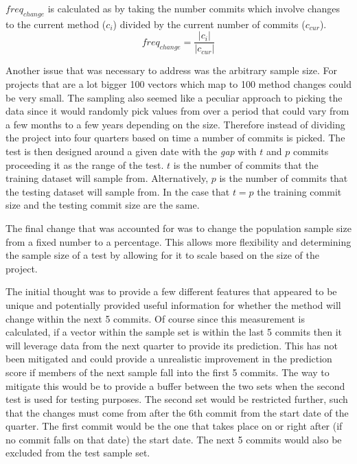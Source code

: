 $freq_{change}$ is calculated as by taking the number commits which involve changes to the current method ($c_i$) divided by the current number of commits ($c_{cur}$).
\begin{equation}
\label{eq:freq_change}
freq_{change} = \frac{|c_i|}{|c_{cur}|}
\end{equation}



Another issue that was necessary to address was the arbitrary sample size. For projects that are a lot bigger 100 vectors which map to 100 method changes could be very small. The sampling also seemed like a peculiar approach to picking the data since it would randomly pick values from over a period that could vary from a few months to a few years depending on the size. Therefore instead of dividing the project into four quarters based on time a number of commits is picked. The test is then designed around a given date with the \textit{gap} with $t$ and $p$ commits proceeding it as the range of the test. $t$ is the number of commits that the training dataset will sample from. Alternatively, $p$ is the number of commits that the testing dataset will sample from. In the case that $t = p$ the training commit size and the testing commit size are the same.

The final change that was accounted for was to change the population sample size from a fixed number to a percentage. This allows more flexibility and determining the sample size of a test by allowing for it to scale based on the size of the project. 



The initial thought was to provide a few different features that appeared to be unique and potentially provided useful information for whether the method will change within the next 5 commits. Of course since this measurement is calculated, if a vector within the sample set is within the last 5 commits then it will leverage data from the next quarter to provide its prediction. This has not been mitigated and could provide a unrealistic improvement in the prediction score if members of the next sample fall into the first 5 commits. The way to mitigate this would be to provide a buffer between the two sets when the second test is used for testing purposes. The second set would be restricted further, such that the changes must come from after the 6th commit from the start date of the quarter. The first commit would be the one that takes place on or right after (if no commit falls on that date) the start date. The next 5 commits would also be excluded from the test sample set.

